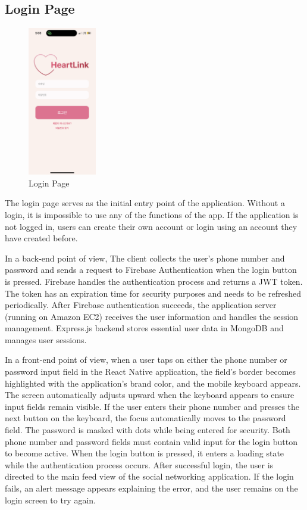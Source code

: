 \documentclass[conference]{IEEEtran}
\begin{document}
   \subsection{Login Page}
        \begin{figure}[htbp]
            \centerline{\includegraphics[width=3cm]{Images/page/login.png}}
            \caption{Login Page}
            \label{fig}
        \end{figure}
        The login page serves as the initial entry point of the application. Without a login, it is impossible to use any of the functions of the app. If the application is not logged in, users can create their own account or login using an account they have created before.

        In a back-end point of view, The client collects the user's phone number and password and sends a request to Firebase Authentication when the login button is pressed. Firebase handles the authentication process and returns a JWT token. The token has an expiration time for security purposes and needs to be refreshed periodically. After Firebase authentication succeeds, the application server (running on Amazon EC2) receives the user information and handles the session management. Express.js backend stores essential user data in MongoDB and manages user sessions.

        In a front-end point of view, when a user taps on either the phone number or password input field in the React Native application, the field's border becomes highlighted with the application's brand color, and the mobile keyboard appears. The screen automatically adjusts upward when the keyboard appears to ensure input fields remain visible. If the user enters their phone number and presses the next button on the keyboard, the focus automatically moves to the password field. The password is masked with dots while being entered for security. Both phone number and password fields must contain valid input for the login button to become active. When the login button is pressed, it enters a loading state while the authentication process occurs. After successful login, the user is directed to the main feed view of the social networking application. If the login fails, an alert message appears explaining the error, and the user remains on the login screen to try again.
\end{document}
